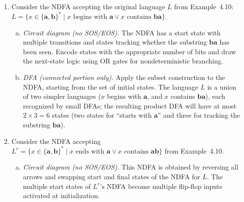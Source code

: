 \begin{enumerate}[{4.}1.]
\begin{enumerate}[(a)]
  Then $\Lambda(s_0)=\{s_0,s_1\}$.  So
  \[
    \DBAR_\lambda(s_0,\pmb{a})
    =\Lambda\!\Bigl(\bigcup_{t\in\Lambda(s_0)}\delta_\lambda(t,\pmb{a})\Bigr)
    =\Lambda(\emptyset\cup\emptyset)=\emptyset,
  \]
  but $\delta_\lambda(s_0,\pmb{a})=\emptyset$ also.  Let us try a different
  example: $\delta_\lambda(s_0,\lambda)=\{s_1\}$, $\delta_\lambda(s_1,\pmb{a})=\{s_1\}$.
  Then $\delta_\lambda(s_0,\pmb{a})=\emptyset$, yet
  \[
    \DBAR_\lambda(s_0,\pmb{a})
    =\Lambda\!\Bigl(\bigcup_{t\in\{s_0,s_1\}}\delta_\lambda(t,\pmb{a})\Bigr)
    =\Lambda(\{s_1\})=\{s_1\}\neq\emptyset=\delta_\lambda(s_0,\pmb{a}).
  \]
  This demonstrates that $\DBAR_\lambda(s,\pmb{a})\neq\delta_\lambda(s,\pmb{a})$
  is possible for $\lambda$-NDFAs.
\end{enumerate}

\item Consider the NDFA accepting the original language $L$ from Example~4.10:
$L=\{x\in\{\pmb{a},\pmb{b}\}^*\mid x\text{ begins with }\pmb{a}\vee x\text{ contains }\pmb{ba}\}$.

\begin{enumerate}[(a)]
  \item \emph{Circuit diagram (no SOS/EOS).}  The NDFA has a start state
  with multiple transitions and states tracking whether the substring $\pmb{ba}$
  has been seen.  Encode states with the appropriate number of bits and draw
  the next-state logic using OR gates for nondeterministic branching.

  \item \emph{DFA (connected portion only).}  Apply the subset construction
  to the NDFA, starting from the set of initial states.  The language $L$ is
  a union of two simpler languages ($x$ begins with $\pmb{a}$, and $x$ contains
  $\pmb{ba}$), each recognized by small DFAs; the resulting product DFA will
  have at most $2\times 3=6$ states (two states for ``starts with $\pmb{a}$''
  and three for tracking the substring $\pmb{ba}$).
\end{enumerate}

\item Consider the NDFA accepting $L^r=\{x\in\{\pmb{a},\pmb{b}\}^*\mid x\text{ ends with }\pmb{a}\vee x\text{ contains }\pmb{ab}\}$ from Example~4.10.

\begin{enumerate}[(a)]
  \item \emph{Circuit diagram (no SOS/EOS).}  This NDFA is obtained by
  reversing all arrows and swapping start and final states of the NDFA for $L$.
  The multiple start states of $L^r$'s NDFA become multiple flip-flop inputs
  activated at initialization.


\end{enumerate}
\end{enumerate}
